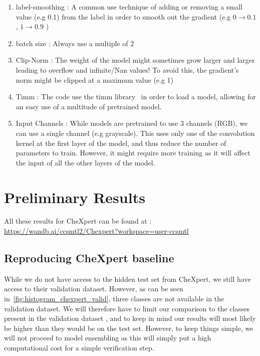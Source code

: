 \documentclass[11pt]{article}
\begin{document}
    \begin{enumerate}
        \item label-smoothing : A common use technique of adding or removing a small value (e.g 0.1) from the label in
        order to smooth out the gradient (e.g $0\xrightarrow{}0.1$ , $1\xrightarrow{}0.9$ )

        \item batch size : Always use a multiple of 2

        \item Clip-Norm : The weight of the model might sometimes grow larger and larger leading to overflow and
        infinite/Nan values! To avoid this, the gradient's norm might be clipped at a maximum value (e.g 1)

        \item Timm : The code use the timm library~\cite{timm} in order to load a model, allowing
        for an easy use of a multitude of pretrained model.

        \item Input Channels : While models are pretrained to use 3 channels (RGB), we can use a single channel (e.g grayscale). This uses
        only one of the convolution kernel at the first layer of the model, and thus reduce the number of parameters to train. However, it might require more training
        as it will affect the input of all the other layers of the model.

    \end{enumerate}

    \section{Preliminary Results}
        All these results for CheXpert can be found at : \url{https://wandb.ai/ccsmtl2/Chexpert?workspace=user-ccsmtl}
        \subsection{Reproducing CheXpert baseline}
            While we do not have access to the hidden test set from CheXpert, we still have access to their validation dataset. However,
            as can be seen in~\ref{fig:histogram_chexpert_valid}, three classes are not available in the validation dataset. We will therefore have to
            limit our comparison to the classes present in the validation dataset , and to keep in mind our results will
            most likely be higher than they would be on the test set. However, to keep things simple, we will not proceed to model ensembling as this
            will simply put a high computational cost for a simple verification step.
\end{document}
